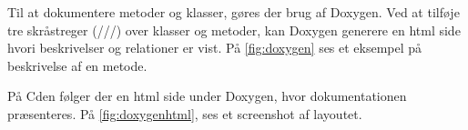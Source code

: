Til at dokumentere metoder og klasser, gøres der brug af Doxygen. Ved at tilføje tre skråstreger (///) over klasser og metoder, kan Doxygen generere en html side hvori beskrivelser og relationer er vist.
På \ref{fig:doxygen} ses et eksempel på beskrivelse af en metode.


På Cden følger der en html side under Doxygen, hvor dokumentationen præsenteres. På \ref{fig:doxygenhtml}, ses et screenshot af layoutet.

